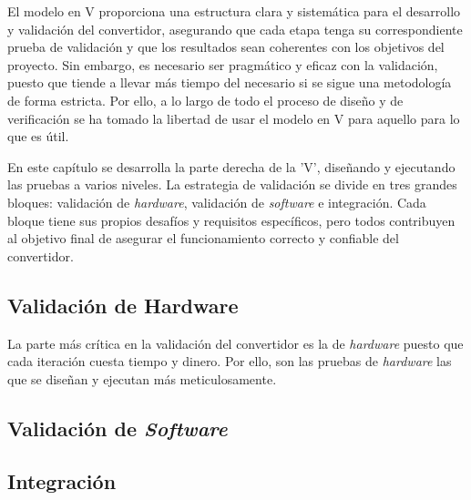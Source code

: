 El modelo en V proporciona una estructura clara y sistemática para el desarrollo y validación del convertidor, asegurando que cada etapa tenga su correspondiente prueba de validación y que los resultados sean coherentes con los objetivos del proyecto. Sin embargo, es necesario ser pragmático y eficaz con la validación, puesto que tiende a llevar más tiempo del necesario si se sigue una metodología de forma estricta. Por ello, a lo largo de todo el proceso de diseño y de verificación se ha tomado la libertad de usar el modelo en V para aquello para lo que es útil.

En este capítulo se desarrolla la parte derecha de la 'V', diseñando y ejecutando las pruebas a varios niveles. La estrategia de validación se divide en tres grandes bloques: validación de \textit{hardware}, validación de \textit{software} e integración. Cada bloque tiene sus propios desafíos y requisitos específicos, pero todos contribuyen al objetivo final de asegurar el funcionamiento correcto y confiable del convertidor.

\subsection{Validación de Hardware}
La parte más crítica en la validación del convertidor es la de \textit{hardware} puesto que cada iteración cuesta tiempo y dinero. Por ello, son las pruebas de \textit{hardware} las que se diseñan y ejecutan más meticulosamente.

\subsection{Validación de \textit{Software}}

\subsection{Integración}
